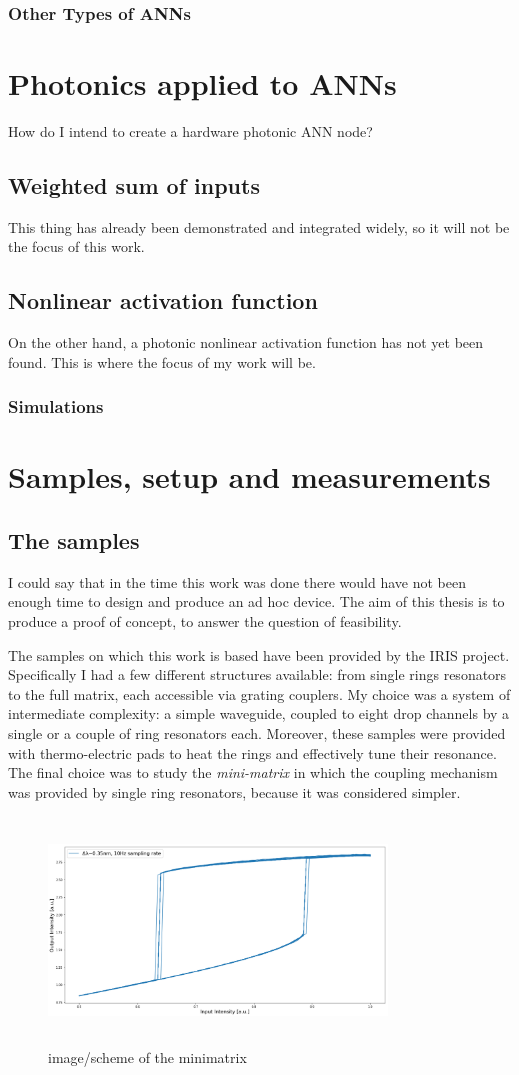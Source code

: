 \documentclass[12pt,a4paper]{book}
\begin{document}
\subsection{Other Types of ANNs}

\chapter{Photonics applied to ANNs}
How do I intend to create a hardware photonic ANN node?
\section{Weighted sum of inputs}
This thing has already been demonstrated and integrated widely, so it will not be the focus of this work.
\section{Nonlinear activation function}
On the other hand, a photonic nonlinear activation function has not yet been found.
This is where the focus of my work will be.

\subsection{Simulations}

\chapter{Samples, setup and measurements}
\section{The samples}
I could say that in the time this work was done there would have not been enough time to design and produce an ad hoc device. The aim of this thesis is to produce a proof of concept, to answer the question of feasibility.
\vspace{1em}

The samples on which this work is based have been provided by the IRIS project.
Specifically I had a few different structures available: from single rings resonators to the full matrix, each accessible via grating couplers.
My choice was a system of intermediate complexity: a simple waveguide, coupled to eight drop channels by a single or a couple of ring resonators each.
Moreover, these samples were provided with thermo-electric pads to heat the rings and effectively tune their resonance.
The final choice was to study the \textit{mini-matrix} in which the coupling mechanism was provided by single ring resonators, because it was considered simpler.

\begin{figure}[ht]
	\centering
	\includegraphics[draft,width=9cm,height=6cm]{figures/foo.png}
	\caption{image/scheme of the minimatrix}
	\label{fig:minimatrix_full}
\end{figure}
\end{document}
